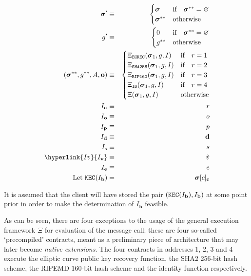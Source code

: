 \documentclass[9pt,oneside]{amsart}
\begin{document}
\begin{multicols}{2}
\begin{eqnarray}
\boldsymbol{\sigma}' & \equiv & \begin{cases}
\boldsymbol{\sigma} & \text{if} \quad \boldsymbol{\sigma}^{**} = \varnothing \\
\boldsymbol{\sigma}^{**} & \text{otherwise}
\end{cases} \\
g' & \equiv & \begin{cases}
0 & \text{if} \quad \boldsymbol{\sigma}^{**} = \varnothing \\
g^{**} & \text{otherwise}
\end{cases} \\
\qquad (\boldsymbol{\sigma}^{**}, g^{**}, A, \mathbf{o}) & \equiv & \begin{cases}
\Xi_{\mathtt{ECREC}}(\boldsymbol{\sigma}_1, g, I) & \text{if} \quad r = 1 \\
\Xi_{\mathtt{SHA256}}(\boldsymbol{\sigma}_1, g, I) & \text{if} \quad r = 2 \\
\Xi_{\mathtt{RIP160}}(\boldsymbol{\sigma}_1, g, I) & \text{if} \quad r = 3 \\
\Xi_{\mathtt{ID}}(\boldsymbol{\sigma}_1, g, I) & \text{if} \quad r = 4 \\
\Xi(\boldsymbol{\sigma}_1, g, I) & \text{otherwise} \end{cases} \\
I_\mathbf{a} & \equiv & r \\
I_\mathbf{o} & \equiv & o \\
I_\mathbf{p} & \equiv & p \\
I_\mathbf{d} & \equiv & \mathbf{d} \\
I_\mathbf{s} & \equiv & s \\
\hyperlink{I v}{I_\mathbf{v}} & \equiv & \tilde{v} \\
I_\mathbf{e} & \equiv & e \\
\text{Let} \; \mathtt{\tiny KEC}(I_\mathbf{b}) & = & \boldsymbol{\sigma}[c]_\mathbf{c}
\end{eqnarray}

It is assumed that the client will have stored the pair $(\mathtt{\tiny KEC}(I_\mathbf{b}), I_\mathbf{b})$ at some point prior in order to make the determination of $I_\mathbf{b}$ feasible.

As can be seen, there are four exceptions to the usage of the general execution framework $\Xi$ for evaluation of the message call: these are four so-called `precompiled' contracts, meant as a preliminary piece of architecture that may later become \textit{native extensions}. The four contracts in addresses 1, 2, 3 and 4 execute the elliptic curve public key recovery function, the SHA2 256-bit hash scheme, the RIPEMD 160-bit hash scheme and the identity function respectively.


\end{multicols}
\end{document}
